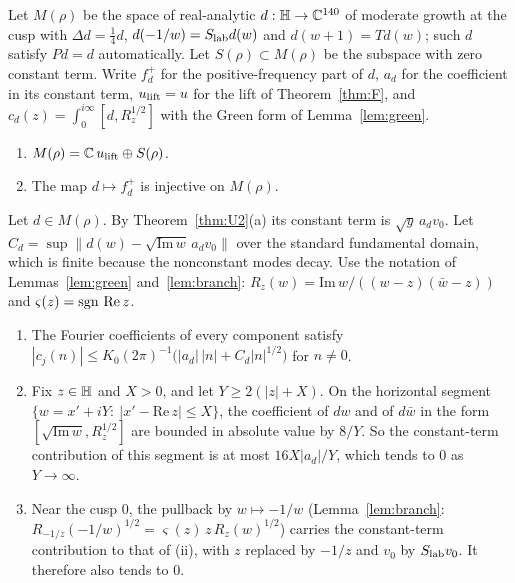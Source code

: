 \medskip\noindent Let $M(\rho)$ be the space of real-analytic $d:\mathbb{H}\to\mathbb{C}^{140}$ of moderate growth at the cusp with $\Delta d=\tfrac14d$, $d(-1/w)=S_{\rm lab}d(w)$ and $d(w+1)=Td(w)$; such $d$ satisfy $Pd=d$ automatically. Let $S(\rho)\subset M(\rho)$ be the subspace with zero constant term. Write $f_d^+$ for the positive-frequency part of $d$, $a_d$ for the coefficient in its constant term, $u_{\rm lift}=u$ for the lift of Theorem~\ref{thm:F}, and $c_d(z)=\int_0^{i\infty}[d,R_z^{1/2}]$ with the Green form of Lemma~\ref{lem:green}.

\begin{theorem}\label{thm:U2}
\begin{enumerate}[label=(\alph*)]
\item $M(\rho)=\mathbb{C}\,u_{\rm lift}\oplus S(\rho)$.
\item The map $d\mapsto f_d^+$ is injective on $M(\rho)$.
\end{enumerate}
\end{theorem}
\begin{lemma}\label{lem:U2est}
Let $d\in M(\rho)$. By Theorem~\ref{thm:U2}(a) its constant term is $\sqrt y\,a_dv_0$. Let $C_d=\sup\|d(w)-\sqrt{\mathrm{Im}\,w}\,a_dv_0\|$ over the standard fundamental domain, which is finite because the nonconstant modes decay. Use the notation of Lemmas~\ref{lem:green} and~\ref{lem:branch}: $R_z(w)=\mathrm{Im}\,w/((w-z)(\bar w-z))$ and $\varsigma(z)=\operatorname{sgn}\,\mathrm{Re}\,z$.
\begin{enumerate}[label=(\roman*)]
\item The Fourier coefficients of every component satisfy $|c_j(n)|\le K_0(2\pi)^{-1}\bigl(|a_d|\,|n|+C_d|n|^{1/2}\bigr)$ for $n\neq0$.
\item Fix $z\in\mathbb{H}$ and $X>0$, and let $Y\ge2(|z|+X)$. On the horizontal segment $\{w=x'+iY:\ |x'-\mathrm{Re}\,z|\le X\}$, the coefficient of $dw$ and of $d\bar w$ in the form $[\sqrt{\mathrm{Im}\,w},R_z^{1/2}]$ are bounded in absolute value by $8/Y$. So the constant-term contribution of this segment is at most $16X|a_d|/Y$, which tends to $0$ as $Y\to\infty$.
\item Near the cusp $0$, the pullback by $w\mapsto-1/w$ (Lemma~\ref{lem:branch}: $R_{-1/z}(-1/w)^{1/2}=\varsigma(z)\,z\,R_z(w)^{1/2}$) carries the constant-term contribution to that of (ii), with $z$ replaced by $-1/z$ and $v_0$ by $S_{\rm lab}v_0$. It therefore also tends to $0$.
\end{enumerate}
\end{lemma}
